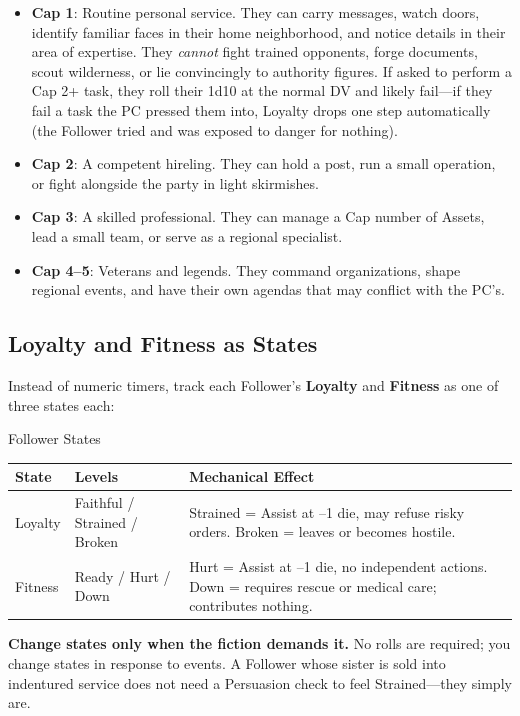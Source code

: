 \begin{itemize}
  \item \textbf{Cap 1}: Routine personal service. They can carry messages, watch doors, identify familiar faces in their home neighborhood, and notice details in their area of expertise. They \emph{cannot} fight trained opponents, forge documents, scout wilderness, or lie convincingly to authority figures. If asked to perform a Cap 2+ task, they roll their 1d10 at the normal DV and likely fail---if they fail a task the PC pressed them into, Loyalty drops one step automatically (the Follower tried and was exposed to danger for nothing).
  \item \textbf{Cap 2}: A competent hireling. They can hold a post, run a small operation, or fight alongside the party in light skirmishes.
  \item \textbf{Cap 3}: A skilled professional. They can manage a Cap number of Assets, lead a small team, or serve as a regional specialist.
  \item \textbf{Cap 4--5}: Veterans and legends. They command organizations, shape regional events, and have their own agendas that may conflict with the PC's.
\end{itemize}

\subsection{Loyalty and Fitness as States}
Instead of numeric timers, track each Follower's \textbf{Loyalty} and \textbf{Fitness} as one of three states each:

\begin{gmtable}{Follower States}
\centering
\small
\begin{tabularx}{\linewidth}{@{}lXl@{}}
\toprule
\textbf{State} & \textbf{Levels} & \textbf{Mechanical Effect} \\
\midrule
Loyalty & Faithful / Strained / Broken & Strained = Assist at --1 die, may refuse risky orders. Broken = leaves or becomes hostile. \\
Fitness & Ready / Hurt / Down & Hurt = Assist at --1 die, no independent actions. Down = requires rescue or medical care; contributes nothing. \\
\bottomrule
\end{tabularx}
\end{gmtable}

\textbf{Change states only when the fiction demands it.} No rolls are required; you change states in response to events. A Follower whose sister is sold into indentured service does not need a Persuasion check to feel Strained---they simply are.

